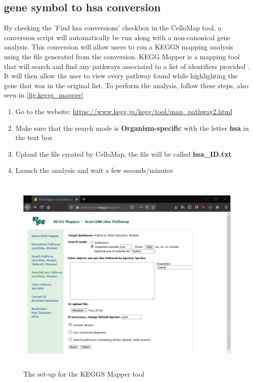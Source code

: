 \documentclass[11pt]{article}
\begin{document}
\subsection{gene symbol to hsa conversion}
By checking the 'Find hsa conversions' checkbox in the CelloMap tool, a conversion script will automatically be run along with a non-canonical gene analysis. This conversion will allow users to run a KEGGS mapping analysis using the file generated from the conversion.
KEGG Mapper is a mapping tool that will search and find any pathways associated to a list of identifiers provided \cite{kanehisa2019kegg}. It will then allow the user to view every pathway found while highlighting the gene that was in the original list.
To perform the analysis, follow these steps, also seen in \autoref{fig:keggs_mapper}
\begin{enumerate}
\item Go to the website: \url{https://www.kegg.jp/kegg/tool/map_pathway2.html}
\item Make sure that the search mode is \textbf{Organism-specific} with the letter \textbf{hsa} in the text box
\item Upload the file created by CelloMap, the file will be called \textbf{hsa\_ID.txt} 
\item Launch the analysis and wait a few seconds/minutes
\end{enumerate}

\begin{figure}[h!]
\centering
\includegraphics[width=15cm,height=10cm,keepaspectratio]{KEGGS_Mapper.png}
\caption{The set-up for the KEGGS Mapper tool}
\label{fig:keggs_mapper}
\end{figure}
\end{document}
